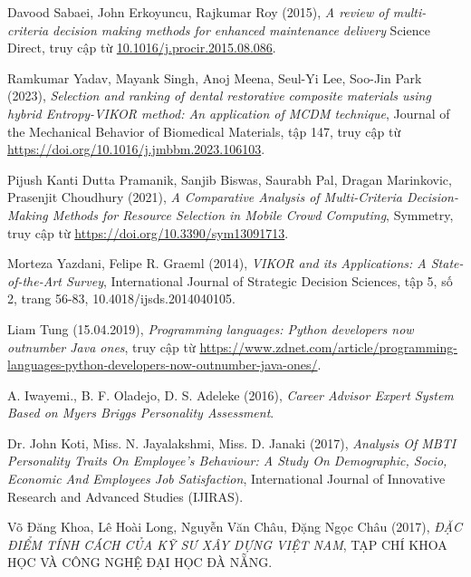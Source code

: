 \begin{thebibliography}{99}
    Davood Sabaei, John Erkoyuncu, Rajkumar Roy (2015),
    \emph{A review of multi-criteria decision making methods for enhanced maintenance delivery}
    Science Direct,
    truy cập từ \href{10.1016/j.procir.2015.08.086}{\color{black}10.1016/j.procir.2015.08.086}.
    
    Ramkumar Yadav, Mayank Singh, Anoj Meena, Seul-Yi Lee, Soo-Jin Park (2023),
    \emph{Selection and ranking of dental restorative composite materials using hybrid Entropy-VIKOR method: An application of MCDM technique},
    Journal of the Mechanical Behavior of Biomedical Materials,
    tập 147,
    truy cập từ \href{https://doi.org/10.1016/j.jmbbm.2023.106103}{\color{black}https://doi.org/10.1016/j.jmbbm.2023.106103}.

    Pijush Kanti Dutta Pramanik, Sanjib Biswas, Saurabh Pal, Dragan Marinkovic, Prasenjit Choudhury (2021),
    \emph{A Comparative Analysis of Multi-Criteria Decision-Making Methods for Resource Selection in Mobile Crowd Computing},
    Symmetry,
    truy cập từ \href{https://doi.org/10.3390/sym13091713}{\color{black}https://doi.org/10.3390/sym13091713}.

    Morteza Yazdani, Felipe R. Graeml (2014),
    \emph{VIKOR and its Applications: A State-of-the-Art Survey},
    International Journal of Strategic Decision Sciences,
    tập 5, số 2,
    trang 56-83,
    10.4018/ijsds.2014040105.

    Liam Tung (15.04.2019),
    \emph{Programming languages: Python developers now outnumber Java ones},
    truy cập từ \href{https://www.zdnet.com/article/programming-languages-python-developers-now-outnumber-java-ones/}{\color{black}https://www.zdnet.com/article/programming-languages-python-developers-now-outnumber-java-ones/}.

    A. Iwayemi., B. F. Oladejo, D. S. Adeleke (2016),
    \emph{Career Advisor Expert System Based on Myers Briggs Personality Assessment}.

    Dr. John Koti, Miss. N. Jayalakshmi, Miss. D. Janaki (2017),
    \emph{Analysis Of MBTI Personality Traits On Employee’s Behaviour: A Study On Demographic, Socio, Economic And Employees Job Satisfaction},
    International Journal of Innovative Research and Advanced Studies (IJIRAS).

    Võ Đăng Khoa, Lê Hoài Long, Nguyễn Văn Châu, Đặng Ngọc Châu (2017),
    \emph{ĐẶC ĐIỂM TÍNH CÁCH CỦA KỸ SƯ XÂY DỰNG VIỆT NAM},
    TẠP CHÍ KHOA HỌC VÀ CÔNG NGHỆ ĐẠI HỌC ĐÀ NẴNG.


\end{thebibliography}
